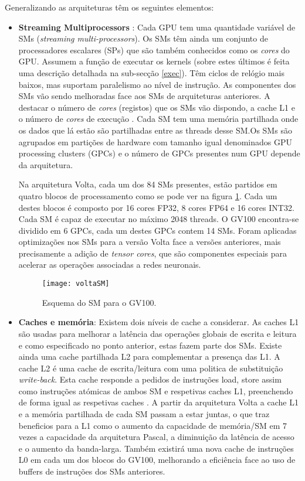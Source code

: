 Generalizando as arquiteturas têm os seguintes elementos:
\begin{itemize}
\item \textbf{Streaming Multiprocessors} : Cada GPU tem uma quantidade variável de SMs (\textit{streaming multi-processors}). Os SMs têm ainda um conjunto de processadores escalares (SPs) que são também conhecidos como os \textit{cores} do GPU. Assumem a função de executar os kernels (sobre estes últimos é feita uma descrição detalhada na sub-secção \ref{exec}). Têm ciclos de relógio mais baixos, mas suportam paralelismo ao nível de instrução. As componentes dos SMs vão sendo melhoradas face aos SMs de arquiteturas anteriores. A destacar o número de \textit{cores} (registos) que os SMs vão dispondo, a cache L1 e o número de \textit{cores} de execução \cite{wilt_2013}. Cada SM tem uma memória partilhada onde os dados que lá estão são partilhadas entre as threads desse SM.Os SMs são agrupados em partições de hardware com tamanho igual denominados GPU processing clusters (GPCs) e o número de GPCs presentes num GPU depende da arquitetura.  \par
Na arquitetura Volta, cada um dos 84 SMs presentes, estão partidos em quatro blocos de processamento como se pode ver na figura \ref{voltaSM}. Cada um destes blocos é composto por 16 cores FP32, 8 cores FP64 e 16 cores INT32. Cada SM é capaz de executar no máximo 2048 threads. O GV100 encontra-se dividido em 6 GPCs, cada um destes GPCs contem 14 SMs.
Foram aplicadas optimizações nos SMs para a versão Volta face a versões anteriores, mais precisamente a adição de \textit{tensor cores}, que são componentes especiais para acelerar as operações associadas a redes neuronais.
 \begin{figure}[ht]
  \centering
    {\texttt{[image: voltaSM]}}
  \caption{Esquema do SM para o GV100\cite{voltaArch}.}
  \label{voltaSM}
 \end{figure}
\item \textbf{Caches e memória}: Existem dois níveis de cache a considerar. As caches L1 são usadas para melhorar a latência das operações globais de escrita e leitura e como especificado no ponto anterior, estas fazem parte dos SMs. Existe ainda uma cache partilhada L2 para complementar a presença das L1. A cache L2 é uma cache de escrita/leitura com uma politica de substituição \textit{write-back}. Esta cache responde a pedidos de instruções load, store assim como instruções atómicas de ambos SM e respetivas caches L1, preenchendo de forma igual as respetivas caches \cite{nickolls2010gpu}. A partir da arquitetura Volta a cache L1 e a memória partilhada de cada SM passam a estar juntas, o que traz beneficios para a L1 como o aumento da capacidade de memória/SM em 7 vezes a capacidade da arquitetura Pascal, a diminuição da latência de acesso e o aumento da banda-larga\cite{voltaArch}.  Também existirá uma nova cache de instruções L0 em cada um dos blocos do GV100, melhorando a eficiência face ao uso de buffers de instruções dos SMs anteriores. 
\end{itemize}
